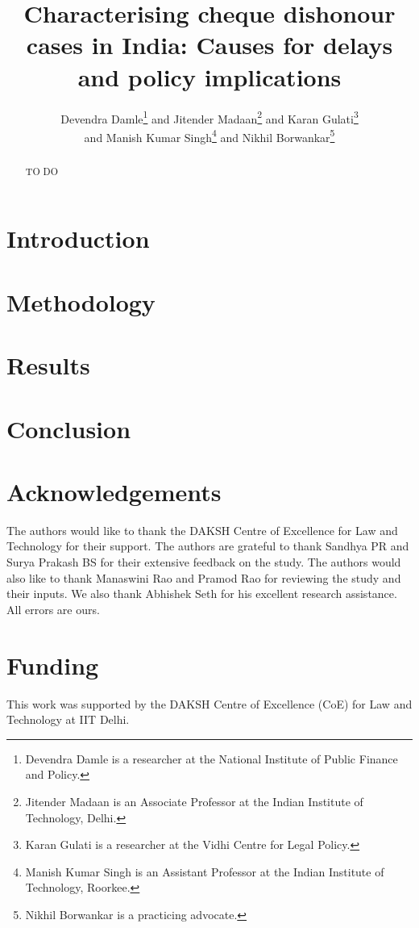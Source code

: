 \documentclass[12pt,a4paper]{article}
\title{Characterising cheque dishonour cases in India: Causes for delays and policy implications}
\author{Devendra Damle\thanks{Devendra Damle is a researcher at the National Institute of Public Finance and Policy.} and Jitender Madaan\thanks{Jitender Madaan is an Associate Professor at the Indian Institute of Technology, Delhi.} and Karan Gulati\thanks{Karan Gulati is a researcher at the Vidhi Centre for Legal Policy.}\\ and Manish Kumar Singh\thanks{Manish Kumar Singh is an Assistant Professor at the Indian Institute of Technology, Roorkee.} and Nikhil Borwankar\thanks{Nikhil Borwankar is a practicing advocate.}}
\begin{document}
\maketitle

\begin{abstract}
TO DO
\end{abstract}

\newpage
\tableofcontents

\newpage
\printglossaries

\newpage
\listoftables

\newpage
\section{Introduction}
\label{sec:introduction}


\section{Methodology}
\label{sec:methodology}


\section{Results}
\label{sec:results}


\section{Conclusion}
\label{sec:conclusion}


\section*{Acknowledgements}
The authors would like to thank the DAKSH Centre of Excellence for Law and Technology for their support. The authors are grateful to thank Sandhya PR and Surya Prakash BS for their extensive feedback on the study. The authors would also like to thank Manaswini Rao and Pramod Rao for reviewing the study and their inputs. We also thank Abhishek Seth for his excellent research assistance. All errors are ours.

\section*{Funding}
This work was supported by the DAKSH Centre of Excellence (CoE) for Law and Technology at IIT Delhi.

\newpage
\printbibliography[heading=bibintoc]

\newpage
\begin{appendices}

\end{appendices}
\end{document}
